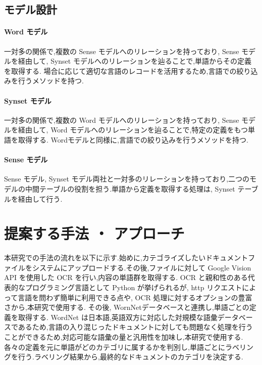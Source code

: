 \subsection{モデル設計}
\label{sunsec:model}

\paragraph{Word モデル}
一対多の関係で,複数の Sense モデルへのリレーションを持っており, Sense モデルを経由して, Synset モデルへのリレーションを辿ることで,単語からその定義を取得する.
場合に応じて適切な言語のレコードを活用するため,言語での絞り込みを行うメソッドを持つ.

\paragraph{Synset モデル}
一対多の関係で,複数の Word モデルへのリレーションを持っており, Sense モデルを経由して, Word モデルへのリレーションを辿ることで,特定の定義をもつ単語を取得する.
Wordモデルと同様に,言語での絞り込みを行うメソッドを持つ.

\paragraph{Sense モデル}
Sense モデル, Synset モデル両社と一対多のリレーションを持っており,二つのモデルの中間テーブルの役割を担う.単語から定義を取得する処理は, Synset テーブルを経由して行う.

\section{提案する手法 ・ アプローチ}
\label{sec:app_method}

本研究での手法の流れを以下に示す.始めに,カテゴライズしたいドキュメントファイルをシステムにアップロードする.その後,ファイルに対して Google Vision API を使用した OCR を行い,内容の単語群を取得する.
OCR と親和性のある代表的なプログラミング言語として Python が挙げられるが, http リクエストによって言語を問わず簡単に利用できる点や, OCR 処理に対するオプションの豊富さから,本研究で使用する.
その後, WornNetデータベースと連携し,単語ごとの定義を取得する. WordNet は日本語,英語双方に対応した対規模な語彙データベースであるため,言語の入り混じったドキュメントに対しても問題なく処理を行うことができるため,対応可能な語彙の量と汎用性を加味し,本研究で使用する.
各々の定義を元に単語がどのカテゴリに属するかを判別し,単語ごとにラベリングを行う.ラベリング結果から,最終的なドキュメントのカテゴリを決定する.


